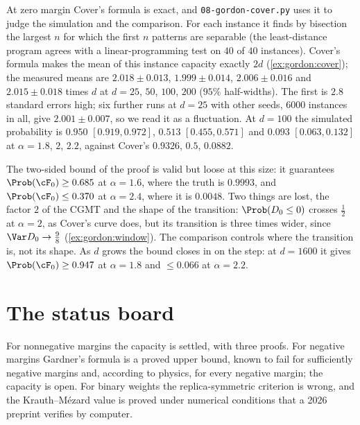 \begin{refsection}
At zero margin Cover's formula is exact, and \texttt{08-gordon-\allowbreak cover.py} uses it to judge the simulation and the comparison. For each instance it finds by bisection the largest $n$ for which the first $n$ patterns are separable (the least-distance program agrees with a linear-programming test on $40$ of $40$ instances). Cover's formula makes the mean of this instance capacity exactly $2d$ (\cref{ex:gordon:cover}); the measured means are $2.018\pm0.013$, $1.999\pm0.014$, $2.006\pm0.016$ and $2.015\pm0.018$ times $d$ at $d=25$, $50$, $100$, $200$ ($95\%$ half-widths). The first is $2.8$ standard errors high; six further runs at $d=25$ with other seeds, $6000$ instances in all, give $2.001\pm0.007$, so we read it as a fluctuation. At $d=100$ the simulated probability is $0.950$ $[0.919,0.972]$, $0.513$ $[0.455,0.571]$ and $0.093$ $[0.063,0.132]$ at $\alpha=1.8$, $2$, $2.2$, against Cover's $0.9326$, $0.5$, $0.0882$.

The two-sided bound of the proof is valid but loose at this size: it guarantees $\Prob(\cF_0)\ge0.685$ at $\alpha=1.6$, where the truth is $0.9993$, and $\Prob(\cF_0)\le0.370$ at $\alpha=2.4$, where it is $0.0048$. Two things are lost, the factor $2$ of the CGMT and the shape of the transition: $\Prob(D_0\le0)$ crosses $\frac12$ at $\alpha=2$, as Cover's curve does, but its transition is three times wider, since $\Var D_0\to\frac98$ (\cref{ex:gordon:window}). The comparison controls where the transition is, not its shape. As $d$ grows the bound closes in on the step: at $d=1600$ it gives $\Prob(\cF_0)\ge0.947$ at $\alpha=1.8$ and $\le0.066$ at $\alpha=2.2$.

\section{The status board}\label{sec:gordon:status}

For nonnegative margins the capacity is settled, with three proofs. For negative margins Gardner's formula is a proved upper bound, known to fail for sufficiently negative margins and, according to physics, for every negative margin; the capacity is open. For binary weights the replica-symmetric criterion is wrong, and the Krauth--Mézard value is proved under numerical conditions that a 2026 preprint verifies by computer.


\end{refsection}
